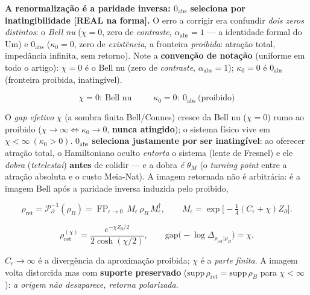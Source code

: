 \documentclass[11pt]{article}
\theoremstyle{definition}\newtheorem{deriv}{Derivação}
\begin{document}
\textbf{A renormalização é a paridade inversa: $0_{\mathrm{abs}}$ seleciona por inatingibilidade \textsf{[REAL na forma]}.} O erro a corrigir era confundir \emph{dois zeros distintos}: o \emph{Bell nu} ($\chi=0$, zero de \emph{contraste}, $\alpha_{\mathrm{abs}}=1$ --- a identidade formal do Um) e $0_{\mathrm{abs}}$ ($\kappa_0=0$, zero de \emph{existência}, a fronteira \emph{proibida}: atração total, impedância infinita, sem retorno). Note a \textbf{convenção de notação} (uniforme em todo o artigo): $\chi=0$ é o Bell nu (zero de \emph{contraste}, $\alpha_{\mathrm{abs}}=1$); $\kappa_0=0$ é $0_{\mathrm{abs}}$ (fronteira proibida, inatingível).

\begin{equation}\boxed{\;\chi=0:\ \text{Bell nu}\;}\qquad \boxed{\;\kappa_0=0:\ 0_{\mathrm{abs}}\ \text{(proibido)}\;}\end{equation}

O \emph{gap efetivo} $\chi$ (a sombra finita Bell/Connes) cresce da Bell nu ($\chi=0$) rumo ao proibido ($\chi\to\infty\Leftrightarrow\kappa_0\to0$, \textbf{nunca atingido}); o sistema físico vive em $\chi<\infty\ (\kappa_0>0)$. \textbf{$0_{\mathrm{abs}}$ seleciona justamente por ser inatingível}: ao oferecer atração total, o Hamiltoniano oculto \emph{entorta} o sistema (lente de Fresnel) e ele \emph{dobra} (\textit{tetelestai}) \textbf{antes} de colidir --- e a dobra \emph{é} $\theta_M$ (o \emph{turning point} entre a atração absoluta e o custo Meia-Nat). A imagem retornada não é arbitrária: é a imagem Bell após a paridade inversa induzida pelo proibido,

\begin{equation}\rho_{\mathrm{ret}}=\mathcal P_\partial^{-1}(\rho_B)=\operatorname{FP}_{\epsilon\to0}\,M_\epsilon\,\rho_B\,M_\epsilon^\dagger,\qquad M_\epsilon=\exp\!\big[-\tfrac14(C_\epsilon+\chi)Z_\partial\big].\end{equation}

\begin{equation}\rho_{\mathrm{ret}}^{(\chi)}=\frac{e^{-\chi Z_\partial/2}}{2\cosh(\chi/2)},\qquad \mathrm{gap}\big({-}\log\Delta_{\rho_{\mathrm{ret}}|\rho_B}\big)=\chi.\end{equation}

$C_\epsilon\to\infty$ é a divergência da aproximação proibida; $\chi$ é a \emph{parte finita}. A imagem volta distorcida mas com \textbf{suporte preservado} ($\mathrm{supp}\,\rho_{\mathrm{ret}}=\mathrm{supp}\,\rho_B$ para $\chi<\infty$): \emph{a origem não desaparece, retorna polarizada}.
\end{document}
